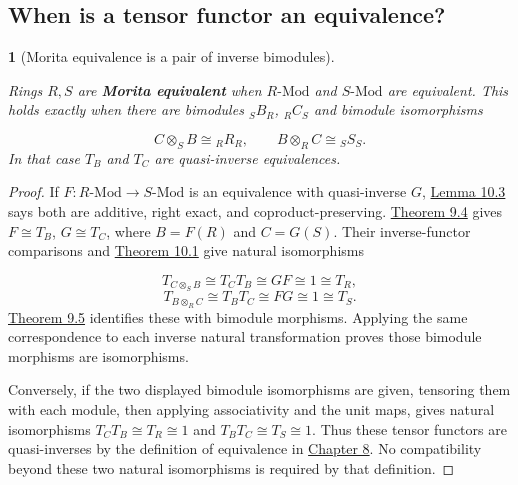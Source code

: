 \documentclass[11pt,a4paper]{article}
\newcommand{\mathheading}{}
\theoremstyle{plain}
\newtheorem*{plainstatement}{\mathheading}
\theoremstyle{definition}
\newenvironment{mathstatement}[3]{\renewcommand{\mathheading}{#1 #2}\begin{plainstatement}[#3]}{\end{plainstatement}}
\begin{document}
 
\subsection{When is a tensor functor an equivalence?}
\label{morita}
 
\begin{mathstatement}{Theorem}{10.5}{Morita equivalence is a pair of inverse bimodules}
\label{env-10-5}

Rings \(R,S\) are \textbf{Morita equivalent} when \(R\text{-Mod}\) and \(S\text{-Mod}\) are equivalent. This holds exactly when there are bimodules \({}_SB_R\), \({}_RC_S\) and bimodule isomorphisms

 \[\boxed{C\otimes_SB\cong{}_RR_R,\qquad B\otimes_RC\cong{}_SS_S.}\] 
In that case \(T_B\) and \(T_C\) are quasi-inverse equivalences.


\par{}\par

\end{mathstatement}
 
\begin{proof}

If \(F:R\text{-Mod}\to S\text{-Mod}\) is an equivalence with quasi-inverse \(G\), \hyperref[env-10-3]{Lemma 10.3} says both are additive, right exact, and coproduct-preserving. \hyperref[env-9-4]{Theorem 9.4} gives \(F\cong T_B\), \(G\cong T_C\), where \(B=F(R)\) and \(C=G(S)\). Their inverse-functor comparisons and \hyperref[env-10-1]{Theorem 10.1} give natural isomorphisms

 \[T_{C\otimes_SB}\cong T_C T_B\cong GF\cong1\cong T_R,\] \[T_{B\otimes_RC}\cong T_B T_C\cong FG\cong1\cong T_S.\] 
\hyperref[env-9-5]{Theorem 9.5} identifies these with bimodule morphisms. Applying the same correspondence to each inverse natural transformation proves those bimodule morphisms are isomorphisms.

 
Conversely, if the two displayed bimodule isomorphisms are given, tensoring them with each module, then applying associativity and the unit maps, gives natural isomorphisms \(T_C T_B\cong T_R\cong1\) and \(T_B T_C\cong T_S\cong1\). Thus these tensor functors are quasi-inverses by the definition of equivalence in \hyperref[chapter-08]{Chapter 8}. No compatibility beyond these two natural isomorphisms is required by that definition.


\end{proof}
 
\end{document}
